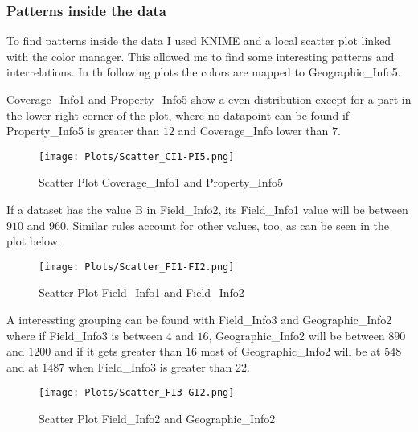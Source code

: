 \subsubsection{Patterns inside the data}

To find patterns inside the data I used KNIME and a local scatter plot linked with the color manager. This allowed me to find some interesting patterns and interrelations. In th following plots the colors are mapped to Geographic\_Info5.

Coverage\_Info1 and Property\_Info5 show a even distribution except for a part in the lower right corner of the plot, where no datapoint can be found if Property\_Info5 is greater than $12$ and Coverage\_Info lower than $7$.
\begin{figure}[H]
	\begin{center}
		\texttt{[image: Plots/Scatter\_CI1-PI5.png]}
	\end{center}
	\caption{Scatter Plot Coverage\_Info1 and Property\_Info5}
\end{figure}

If a dataset has the value B in Field\_Info2, its Field\_Info1 value will be between $910$ and $960$. Similar rules account for other values, too, as can be seen in the plot below.
\begin{figure}[H]
	\begin{center}
		\texttt{[image: Plots/Scatter\_FI1-FI2.png]}
	\end{center}
	\caption{Scatter Plot Field\_Info1 and Field\_Info2}
\end{figure}

A interessting grouping can be found with Field\_Info3 and Geographic\_Info2 where if Field\_Info3 is between $4$ and $16$, Geographic\_Info2 will be between $890$ and $1200$ and if it gets greater than $16$ most of Geographic\_Info2 will be at $548$ and at $1487$ when Field\_Info3 is greater than 22. 

\begin{figure}[H]
	\begin{center}
		\texttt{[image: Plots/Scatter\_FI3-GI2.png]}
	\end{center}
	\caption{Scatter Plot Field\_Info2 and Geographic\_Info2}
\end{figure}

